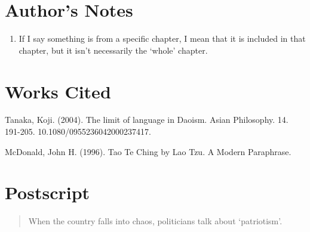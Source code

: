 \newpage

\section*{\centering Author's Notes}

\begin{enumerate}
    \item If I say something is from a specific chapter, I mean that it is included in that chapter, but it isn’t necessarily the ‘whole’ chapter.
\end{enumerate}


\section*{\centering Works Cited}

Tanaka, Koji. (2004). The limit of language in Daoism. Asian Philosophy. 14. 191-205. 10.1080/0955236042000237417.

McDonald, John H. (1996). Tao Te Ching by Lao Tzu. A Modern Paraphrase.

\section*{\centering Postscript}

\begin{verse}
When the country falls into chaos, politicians talk about `patriotism'.\\
\end{verse}
    
